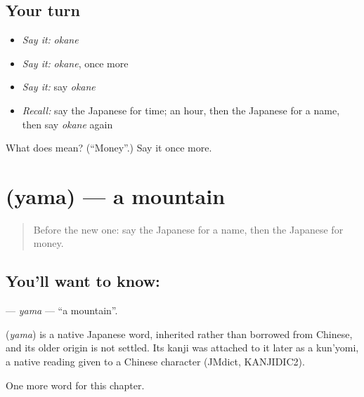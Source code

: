 \subsection*{Your turn}
\begin{itemize}
\raggedright
  \item \emph{Say it:} \emph{okane}
  \item \emph{Say it:} \emph{okane}, once more
  \item \emph{Say it:} say \emph{okane}
  \item \emph{Recall:} say the Japanese for time; an hour, then the Japanese for a name, then say \emph{okane} again
\end{itemize}

\begin{tcolorbox}[breakable,colback=teal!4,colframe=teal!35!black,title={Before you move on}]
What does  mean? (\textquotedblleft{}Money\textquotedblright{}.) Say it once more.
\end{tcolorbox}
\section[\texorpdfstring{\ja{やま} (yama)}{やま (yama)}]{ (yama) — a mountain}

\label{lesson:JA-C41-yama}



\begin{quote}
Before the new one: say the Japanese for a name, then the Japanese for money.
\end{quote}

\subsection*{You'll want to know: }
\textbf{} — \emph{yama} — \textquotedblleft{}a mountain\textquotedblright{}.

\begin{cousinweb}
\textbf{} (\emph{yama}) is a native Japanese word, inherited rather than borrowed from Chinese, and its older origin is not settled. Its kanji was attached to it later as a kun'yomi, a native reading given to a Chinese character (JMdict, KANJIDIC2).
\end{cousinweb}

\begin{grammarlens}[title={What you've built}]
One more word for this chapter.
\end{grammarlens}

